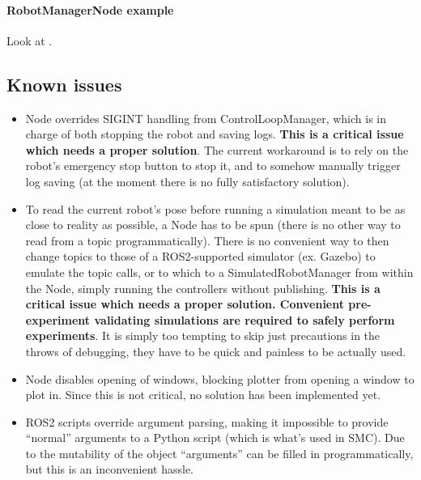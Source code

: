 \paragraph{RobotManagerNode example}
Look at 
.


\subsection{Known issues}
\begin{itemize}
		\item Node overrides SIGINT handling from ControlLoopManager, which is in charge 
				of both stopping the robot and saving logs. 
				\textbf{This is a critical issue which needs a proper solution}.
				The current workaround is to rely on the robot's emergency stop button to stop it,
				and to somehow manually trigger log saving (at the moment there is no fully satisfactory solution).
		\item To read the current robot's pose before running a simulation meant to be as close to reality as possible,
				a Node has to be spun (there is no other way to read from a topic programmatically). 
				There is no convenient way to then change topics to those of a ROS2-supported simulator (ex. Gazebo)
				to emulate the topic calls, or to which to a SimulatedRobotManager from within the Node,
				simply running the controllers without publishing. 
				\textbf{This is a critical issue which needs a proper solution. Convenient
				pre-experiment validating simulations are required to safely perform experiments}.
				It is simply too tempting to skip just precautions in the throws of debugging,
				they have to be quick and painless to be actually used.
		\item Node disables opening of windows, blocking plotter from opening a window to plot in.
				Since this is not critical, no solution has been implemented yet.
		\item ROS2 scripts override argument parsing, making it impossible to provide ``normal'' arguments
				to a Python script (which is what's used in SMC). 
				Due to the mutability of the  object ``arguments''
				can be filled in programmatically, but this is an inconvenient hassle.
\end{itemize}

